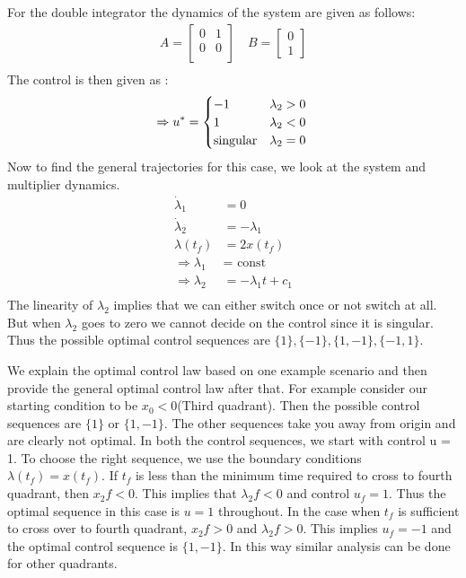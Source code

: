 \begin{enumerate}
     For the double integrator the dynamics of the system are given as follows:
       \begin{align*}
        A = \begin{bmatrix}
             0 & 1 \\
             0 & 0 \\
            \end{bmatrix} \quad 
        B = \begin{bmatrix}
             0 \\
             1
            \end{bmatrix}\\
       \end{align*}
       The control is then given as :
	 \begin{equation*}
	\Rightarrow u^* = \begin{cases}
                         -1 & \lambda_2 > 0\\
                         1 & \lambda_2 < 0\\
                         \mbox{singular} & \lambda_2 = 0
                        \end{cases}\\  
	 \end{equation*}
    Now to find the general trajectories for this case, we look at the system and multiplier dynamics. 
    \begin{align*}
    \dot \lambda_1 &= 0\\
    \dot \lambda_2  &= - \lambda_1\\
    \lambda(t_f) &= 2 x(t_f) \\
    \Rightarrow \lambda_1 &= \mbox{ const } \\
    \Rightarrow \lambda_2 &= -\lambda_1 t + c_1 \\
    \end{align*}
    The linearity of $\lambda_2$ implies that we can either switch once or not switch at all. But when $\lambda_2$ goes to zero we cannot decide on
the control since it is singular. Thus the possible optimal control sequences are $\{1\}, \{-1\}, \{1, -1\}, \{-1,1\}$.  

We explain the optimal control law based on one example scenario and then provide the general optimal control law after that. For 
example consider our starting condition to be $x_{0} < 0$(Third quadrant). Then the possible control sequences are $\{1\}$ or $\{1, -1\}$. The other sequences take you away from origin and are clearly not optimal.
In both the control sequences, we start with control u = 1. To choose the right sequence, we use the boundary conditions $\lambda(t_f) = x(t_f)$. If $t_f$ is less than the minimum time required to 
cross to fourth quadrant, then $x_2f < 0$. This implies that $\lambda_2f < 0$ and control $u_f = 1$. Thus the optimal sequence in this case is $u = 1$ throughout. In the case when $t_f$ is sufficient
to cross over to fourth quadrant, $x_2f > 0$ and $\lambda_2f > 0$. This implies $u_f = -1$ and the optimal control sequence is $\{1, -1\}$. In this way similar analysis can be done for other quadrants.


\end{enumerate}
